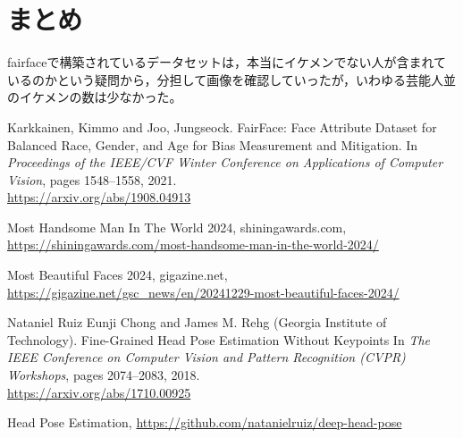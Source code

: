 \documentclass[a4paper,11pt,titlepage]{jsarticle}
\begin{document}
\section{まとめ}
fairfaceで構築されているデータセットは，本当にイケメンでない人が含まれているのかという疑問から，分担して画像を確認していったが，いわゆる芸能人並のイケメンの数は少なかった。


\begin{thebibliography}{9}
    Karkkainen, Kimmo and Joo, Jungseock.
    FairFace: Face Attribute Dataset for Balanced Race, Gender, and Age for Bias Measurement and Mitigation.
    In \textit{Proceedings of the IEEE/CVF Winter Conference on Applications of Computer Vision}, pages 1548--1558, 2021.\\
        \url{https://arxiv.org/abs/1908.04913}
    
    Most Handsome Man In The World 2024, shiningawards.com, \\
    \url{https://shiningawards.com/most-handsome-man-in-the-world-2024/}
    
    Most Beautiful Faces 2024, gigazine.net, \\ \url{https://gigazine.net/gsc_news/en/20241229-most-beautiful-faces-2024/}
    
        Nataniel Ruiz Eunji Chong and James M. Rehg (Georgia Institute of Technology).
        Fine-Grained Head Pose Estimation Without Keypoints
         In \textit{The IEEE Conference on Computer Vision and Pattern Recognition (CVPR) Workshops}, pages 2074--2083, 2018. \\
          \url{https://arxiv.org/abs/1710.00925}

    Head Pose Estimation, \url{https://github.com/natanielruiz/deep-head-pose}
\end{thebibliography}
\end{document}

